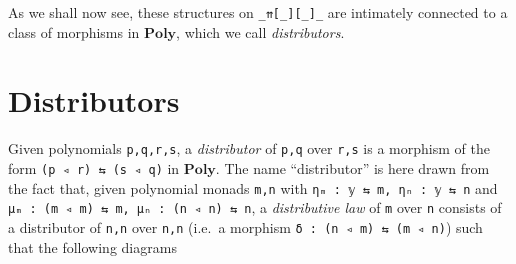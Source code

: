\documentclass[
  11pt,
  oneside,
  article]{memoir}
\theoremstyle{definition}
\theoremstyle{plain}
\newcommand{\0}{\textsf{0}}
\newcommand{\1}{\tn{\textsf{1}}}
\begin{document}
As we shall now see, these structures on \texttt{\_⇈{[}\_{]}{[}\_{]}\_}
are intimately connected to a class of morphisms in \(\mathbf{Poly}\),
which we call \emph{distributors}.

\section{Distributors}\label{distributors}

Given polynomials \texttt{p,q,r,s}, a \emph{distributor} of \texttt{p,q}
over \texttt{r,s} is a morphism of the form
\texttt{(p\ ◃\ r)\ ⇆\ (s\ ◃\ q)} in \(\mathbf{Poly}\). The name
``distributor'' is here drawn from the fact that, given polynomial
monads \texttt{m,n} with \texttt{ηₘ\ :\ 𝕪\ ⇆\ m,\ ηₙ\ :\ 𝕪\ ⇆\ n} and
\texttt{μₘ\ :\ (m\ ◃\ m)\ ⇆\ m,\ μₙ\ :\ (n\ ◃\ n)\ ⇆\ n}, a
\emph{distributive law} of \texttt{m} over \texttt{n} consists of a
distributor of \texttt{n,n} over \texttt{n,n} (i.e.~a morphism
\texttt{δ\ :\ (n\ ◃\ m)\ ⇆\ (m\ ◃\ n)}) such that the following diagrams
\end{document}
